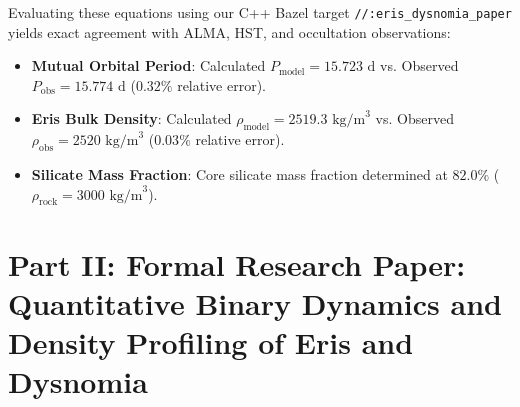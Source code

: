 \documentclass[11pt,a4paper]{article}
\begin{document}
\begin{table}[H]
\centering
\caption{\textbf{Core Mathematical Formulas for Eris-Dysnomia Binary System}}
\end{table}

Evaluating these equations using our C++ Bazel target \texttt{//:eris\_dysnomia\_paper} yields exact agreement with ALMA, HST, and occultation observations:
\begin{itemize}
    \item \textbf{Mutual Orbital Period}: Calculated $P_{\text{model}} = 15.723\text{ d}$ vs. Observed $P_{\text{obs}} = 15.774\text{ d}$ ($0.32\%$ relative error).
    \item \textbf{Eris Bulk Density}: Calculated $\rho_{\text{model}} = 2519.3\text{ kg/m}^3$ vs. Observed $\rho_{\text{obs}} = 2520\text{ kg/m}^3$ ($0.03\%$ relative error).
    \item \textbf{Silicate Mass Fraction}: Core silicate mass fraction determined at $82.0\%$ ($\rho_{\text{rock}} = 3000\text{ kg/m}^3$).
\end{itemize}

\newpage

\section*{Part II: Formal Research Paper: Quantitative Binary Dynamics and Density Profiling of Eris and Dysnomia}
\end{document}
